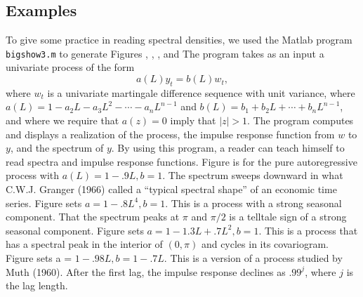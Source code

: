 \subsection{Examples}
To give some practice in reading spectral densities,
we used the Matlab program {\tt bigshow3.m}  to generate
Figures , , , and 
 The program takes as an input a univariate process of the
form
$$ a(L) y_t = b(L) w_t,$$
where $w_t$ is a univariate martingale difference sequence with
unit variance, where $a(L) = 1 - a_2 L - a_3 L^2 - \cdots - a_n
L^{n-1}$ and $b(L) = b_1 +  b_2 L + \cdots + b_n L^{n-1}$, and
where we require that $a(z)=0 $ imply that $| z | > 1$.   The
program computes and displays a realization of the process, the
impulse response function from $w$ to $y$, and the spectrum of
$y$. By using this program, a reader can teach himself to read
spectra and impulse response functions. Figure  is for the pure
autoregressive process with $a(L) = 1 -.9L, b=1$. The spectrum
sweeps downward in what C.W.J. Granger (1966) called a ``typical
spectral shape'' of  an economic time series.
 Figure  sets $a=1-.8L^4, b=1$.  This is a process with
a strong seasonal component.  That the spectrum
peaks at $\pi$ and $\pi/2$ is a  telltale sign of
a strong seasonal component. Figure  sets
$a=1 -1.3 L + .7L^2, b=1$.  This
is a process that has a spectral peak in the interior of $(0, \pi)$ and cycles in its
covariogram.
Figure  sets a = $1-.98L, b = 1 -.7L$.  This
is a version of a process studied by Muth (1960).  After the first
lag, the impulse response declines as $.99^j$, where
$j$ is the lag length.
%
\medskip



